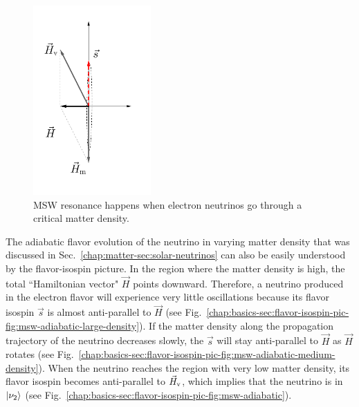 \begin{figure}[h!t]
    \centering
    \includegraphics[width=0.4\textwidth]{chapters/assets/basics/matter-effect-critical-density}
    \caption{MSW resonance happens when electron neutrinos go through a critical matter density.}
    \label{chap:basics-sec:flavor-isospin-pic-fig:msw-adiabatic-critical}
\end{figure}


The adiabatic flavor evolution of the neutrino in varying matter density that was discussed in Sec.~\ref{chap:matter-sec:solar-neutrinos} can also be easily understood by the flavor-isospin picture.
In the region where the matter density is high, the total ``Hamiltonian vector" $\vec H$ points downward. Therefore, a neutrino produced in the electron flavor will experience very little oscillations because its flavor isospin $\vec s$ is almost anti-parallel to $\vec H$ (see Fig.~\ref{chap:basics-sec:flavor-isospin-pic-fig:msw-adiabatic-large-density}). If the matter density along the propagation trajectory of the neutrino decreases slowly, the $\vec s$ will stay anti-parallel to $\vec H$ as $\vec H$ rotates (see Fig.~\ref{chap:basics-sec:flavor-isospin-pic-fig:msw-adiabatic-medium-density}).
When the neutrino reaches the region with very low matter density, its flavor isospin becomes anti-parallel to $\vec H_{\mathrm v}$, which implies that the neutrino is in $\left| \nu_2\right\rangle$ (see Fig.~\ref{chap:basics-sec:flavor-isospin-pic-fig:msw-adiabatic}).




